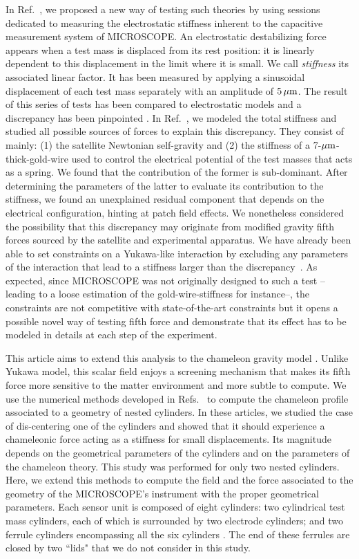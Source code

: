 \documentclass[aps,prd,twocolumn,superscriptaddress,nofootinbib,eqsecnumm,showpacs]{revtex4-1}
\renewcommand\({\left(}
\renewcommand\){\right)}
\renewcommand\[{\left[}
\renewcommand\]{\right]}
\begin{document}
In Ref.~\cite{CQG2}, we proposed a new way of testing such theories by using sessions dedicated to measuring the electrostatic stiffness inherent to the capacitive measurement system of MICROSCOPE. An electrostatic destabilizing force appears when a test mass is displaced from its rest position: it is linearly dependent to this displacement in the limit where it is small. We call {\em stiffness} its associated linear factor. It has been measured by applying a sinusoidal displacement of each test mass separately with an amplitude of $5\,\mu{\rm m}$.  The result of this series of tests has been compared to electrostatic models and a discrepancy has been pinpointed \cite{Chhun}. In Ref.~\cite{CQG2}, we modeled the total stiffness and studied all possible sources of forces to explain this discrepancy. They consist of mainly: (1) the satellite Newtonian self-gravity and (2) the stiffness of a 7-$\mu{\rm m}$-thick-gold-wire used to control the electrical potential of the test masses that acts as a spring. We found that the contribution of the former is sub-dominant. After determining the parameters of the latter to evaluate its contribution to the stiffness, we found an unexplained residual component that depends on the electrical configuration, hinting at patch field effects. We nonetheless considered the possibility that this discrepancy may originate from modified gravity fifth forces sourced by the satellite and experimental apparatus. We have already been able to set constraints on a Yukawa-like interaction by excluding any parameters of the interaction that lead to a stiffness larger than the discrepancy~\cite{CQG2}. As expected, since MICROSCOPE was not originally designed to such a test --leading to a loose estimation of the gold-wire-stiffness for instance--, the constraints are not competitive with state-of-the-art constraints but it opens a possible novel way of testing fifth force and demonstrate that its effect has to be modeled in details at each step of the experiment.

This article aims to extend this analysis to the chameleon gravity model \citep{khoury_chameleon_2004a,khoury_chameleon_2004}. Unlike Yukawa model, this scalar field enjoys a screening mechanism that makes its fifth force more sensitive to the matter environment and more subtle to compute. We use the numerical methods developed in Refs.~\cite{PRD1, PRD2} to compute the chameleon profile associated to a geometry of nested cylinders. In these articles, we studied the case of dis-centering one of the cylinders and showed that it should experience a chameleonic force acting as a stiffness for small displacements. Its magnitude depends on the geometrical parameters of the cylinders and on the parameters of the chameleon theory. This study was performed for only two nested cylinders. Here, we extend this methods to compute the field and the force associated to the geometry of the MICROSCOPE's instrument with the proper geometrical parameters. Each sensor unit is composed of eight cylinders: two cylindrical test mass cylinders, each of which is surrounded by two electrode cylinders; and two ferrule cylinders encompassing all the six cylinders \cite{Touboul_2019}. The end of these ferrules are closed by two ``lids" that we do not consider in this study.
\end{document}
